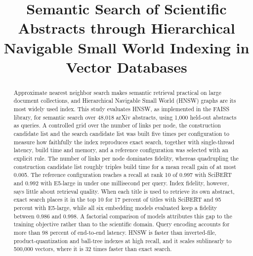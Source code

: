 \documentclass[conference, letterpaper]{IEEEtran}
\newif\ifblind
\begin{document}
\title{Semantic Search of Scientific Abstracts through Hierarchical Navigable Small World Indexing in Vector Databases}

\ifblind
\author{\IEEEauthorblockN{Anonymous Authors}
\IEEEauthorblockA{Affiliation withheld for double-blind review}}
\else
\author{
}
\fi

\maketitle

\ifblind\else
\renewcommand{\thefootnote}{\fnsymbol{footnote}}
\fi

\begin{abstract}
Approximate nearest neighbor search makes semantic retrieval practical on large document collections, and Hierarchical Navigable Small World (HNSW) graphs are its most widely used index. This study evaluates HNSW, as implemented in the FAISS library, for semantic search over 48,018 arXiv abstracts, using 1,000 held-out abstracts as queries. A controlled grid over the number of links per node, the construction candidate list and the search candidate list was built five times per configuration to measure how faithfully the index reproduces exact search, together with single-thread latency, build time and memory, and a reference configuration was selected with an explicit rule. The number of links per node dominates fidelity, whereas quadrupling the construction candidate list roughly triples build time for a mean recall gain of at most 0.005. The reference configuration reaches a recall at rank 10 of 0.997 with SciBERT and 0.992 with E5-large in under one millisecond per query. Index fidelity, however, says little about retrieval quality. When each title is used to retrieve its own abstract, exact search places it in the top 10 for 17 percent of titles with SciBERT and 95 percent with E5-large, while all six embedding models evaluated keep a fidelity between 0.986 and 0.998. A factorial comparison of models attributes this gap to the training objective rather than to the scientific domain. Query encoding accounts for more than 98 percent of end-to-end latency. HNSW is faster than inverted-file, product-quantization and ball-tree indexes at high recall, and it scales sublinearly to 500,000 vectors, where it is 32 times faster than exact search.
\end{abstract}
\end{document}
